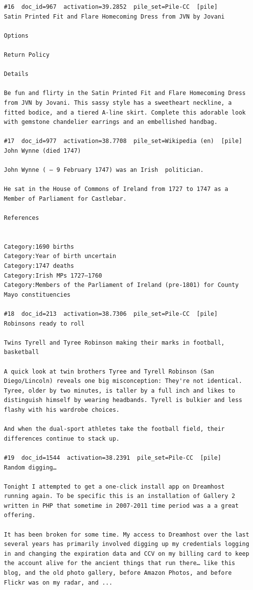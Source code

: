 \begin{verbatim}
#16  doc_id=967  activation=39.2852  pile_set=Pile-CC  [pile]
Satin Printed Fit and Flare Homecoming Dress from JVN by Jovani

Options

Return Policy

Details

Be fun and flirty in the Satin Printed Fit and Flare Homecoming Dress from JVN by Jovani. This sassy style has a sweetheart neckline, a fitted bodice, and a tiered A-line skirt. Complete this adorable look with gemstone chandelier earrings and an embellished handbag.

#17  doc_id=977  activation=38.7708  pile_set=Wikipedia (en)  [pile]
John Wynne (died 1747)

John Wynne ( – 9 February 1747) was an Irish  politician.

He sat in the House of Commons of Ireland from 1727 to 1747 as a Member of Parliament for Castlebar.

References 
 

Category:1690 births
Category:Year of birth uncertain
Category:1747 deaths
Category:Irish MPs 1727–1760
Category:Members of the Parliament of Ireland (pre-1801) for County Mayo constituencies

#18  doc_id=213  activation=38.7306  pile_set=Pile-CC  [pile]
Robinsons ready to roll

Twins Tyrell and Tyree Robinson making their marks in football, basketball

A quick look at twin brothers Tyree and Tyrell Robinson (San Diego/Lincoln) reveals one big misconception: They're not identical. Tyree, older by two minutes, is taller by a full inch and likes to distinguish himself by wearing headbands. Tyrell is bulkier and less flashy with his wardrobe choices.

And when the dual-sport athletes take the football field, their differences continue to stack up.

#19  doc_id=1544  activation=38.2391  pile_set=Pile-CC  [pile]
Random digging…

Tonight I attempted to get a one-click install app on Dreamhost running again. To be specific this is an installation of Gallery 2 written in PHP that sometime in 2007-2011 time period was a a great offering.

It has been broken for some time. My access to Dreamhost over the last several years has primarily involved digging up my credentials logging in and changing the expiration data and CCV on my billing card to keep the account alive for the ancient things that run there… like this blog, and the old photo gallery, before Amazon Photos, and before Flickr was on my radar, and ...


\end{verbatim}
